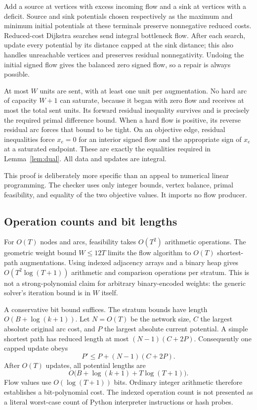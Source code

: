 \documentclass[11pt,letterpaper]{article}
\theoremstyle{definition}
\begin{document}
Add a source at vertices with excess incoming flow and a sink at vertices with a deficit. Source and sink potentials chosen respectively as the maximum and minimum initial potentials at these terminals preserve nonnegative reduced costs. Reduced-cost Dijkstra searches send integral bottleneck flow. After each search, update every potential by its distance capped at the sink distance; this also handles unreachable vertices and preserves residual nonnegativity. Undoing the initial signed flow gives the balanced zero signed flow, so a repair is always possible.

At most $W$ units are sent, with at least one unit per augmentation. No hard arc of capacity $W+1$ can saturate, because it began with zero flow and receives at most the total sent units. Its forward residual inequality survives and is precisely the required primal difference bound. When a hard flow is positive, its reverse residual arc forces that bound to be tight. On an objective edge, residual inequalities force $x_e=0$ for an interior signed flow and the appropriate sign of $x_e$ at a saturated endpoint. These are exactly the equalities required in Lemma~\ref{lem:dual}. All data and updates are integral.

This proof is deliberately more specific than an appeal to numerical linear programming. The checker uses only integer bounds, vertex balance, primal feasibility, and equality of the two objective values. It imports no flow producer.

\subsection{Operation counts and bit lengths}
For $O(T)$ nodes and arcs, feasibility takes $O(T^2)$ arithmetic operations. The geometric weight bound $W\leq12T$ limits the flow algorithm to $O(T)$ shortest-path augmentations. Using indexed adjacency arrays and a binary heap gives $O(T^2\log(T+1))$ arithmetic and comparison operations per stratum. This is not a strong-polynomial claim for arbitrary binary-encoded weights: the generic solver's iteration bound is in $W$ itself.

A conservative bit bound suffices. The stratum bounds have length $O(B+\log(k+1))$. Let $N=O(T)$ be the network size, $C$ the largest absolute original arc cost, and $P$ the largest absolute current potential. A simple shortest path has reduced length at most $(N-1)(C+2P)$. Consequently one capped update obeys
\[
 P'\leq P+(N-1)(C+2P).
\]
After $O(T)$ updates, all potential lengths are
\begin{equation}\label{eq:bitlength}
 O\bigl(B+\log(k+1)+T\log(T+1)\bigr).
\end{equation}
Flow values use $O(\log(T+1))$ bits. Ordinary integer arithmetic therefore establishes a bit-polynomial cost. The indexed operation count is not presented as a literal worst-case count of Python interpreter instructions or hash probes.
\end{document}
